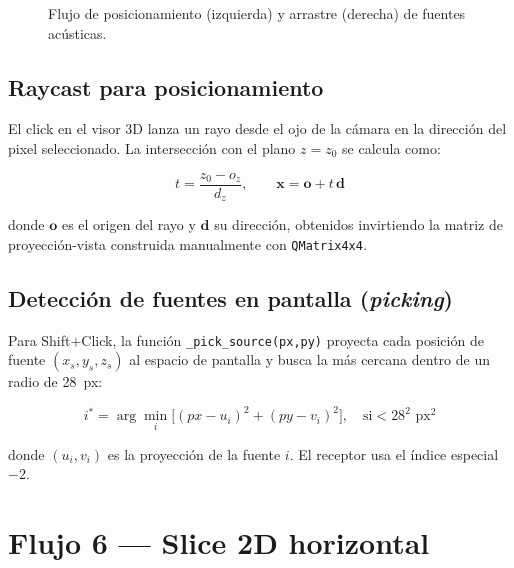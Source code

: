 \documentclass[11pt,a4paper]{article}
\begin{document}
\begin{figure}[H]
\caption{Flujo de posicionamiento (izquierda) y arrastre (derecha) de fuentes acústicas.}
\end{figure}

\subsection*{Raycast para posicionamiento}

El click en el visor 3D lanza un rayo desde el ojo de la cámara en la
dirección del pixel seleccionado.  La intersección con el plano $z = z_0$
se calcula como:

\[
  t = \frac{z_0 - o_z}{d_z}, \qquad
  \mathbf{x} = \mathbf{o} + t\,\mathbf{d}
\]

donde $\mathbf{o}$ es el origen del rayo y $\mathbf{d}$ su dirección,
obtenidos invirtiendo la matriz de proyección-vista construida manualmente
con \texttt{QMatrix4x4}.

\subsection*{Detección de fuentes en pantalla (\textit{picking})}

Para Shift+Click, la función \texttt{\_pick\_source(px,py)} proyecta cada
posición de fuente $(x_s,y_s,z_s)$ al espacio de pantalla y busca la más
cercana dentro de un radio de 28~px:

\[
  i^* = \arg\min_{i} \bigl[(px - u_i)^2 + (py - v_i)^2\bigr],
  \quad \text{si} < 28^2 \text{ px}^2
\]

donde $(u_i, v_i)$ es la proyección de la fuente $i$.  El receptor usa el
índice especial $-2$.

\section{Flujo 6 — Slice 2D horizontal}
\end{document}

